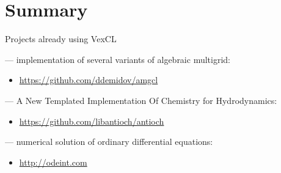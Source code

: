 \documentclass[@BEAMER_OPTIONS@]{beamer}
\begin{document}
\section{Summary}

\begin{frame}{Projects already using VexCL}
    \begin{description}[\quad]
        \item[AMGCL] --- implementation of several variants of algebraic
            multigrid:
            \begin{itemize}
                \item \href{https://github.com/ddemidov/amgcl}{https://github.com/ddemidov/amgcl}
            \end{itemize}
            \vspace{\baselineskip}
        \item[Antioch] --- A New Templated Implementation Of Chemistry for
            Hydrodynamics:
            \begin{itemize}
                \item \href{https://github.com/libantioch/antioch}{https://github.com/libantioch/antioch}
            \end{itemize}
            \vspace{\baselineskip}
        \item[Boost.odeint] --- numerical solution of ordinary differential
            equations:
            \begin{itemize}
                \item \href{http://odeint.com}{http://odeint.com}
            \end{itemize}
    \end{description}
\end{frame}

\note{ }
\end{document}
